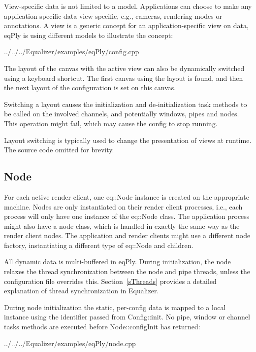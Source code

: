 \documentclass[10pt,a4]{scrartcl}
\newcommand{\sref}[1]{Section~\ref{#1}}
\begin{document}
View-specific data is not limited to a model. Applications can choose to
make any application-specific data view-specific, e.g., cameras,
rendering modes or annotations. A view is a generic concept for an
application-specific view on data, \textsf{eqPly} is using different
models to illustrate the concept:

{\footnotesize
  {../../../Equalizer/examples/eqPly/config.cpp}}

The layout of the canvas with the active view can also be dynamically
switched using a keyboard shortcut. The first canvas using the layout is
found, and then the next layout of the configuration is set on this
canvas. 

Switching a layout causes the initialization and de-initialization task
methods to be called on the involved channels, and potentially windows,
pipes and nodes. This operation might fail, which may cause the config
to stop running.

Layout switching is typically used to change the presentation of views
at runtime. The source code omitted for brevity.


\subsection{Node}

For each active render client, one \textsf{eq::Node} instance is created on the
appropriate machine. Nodes are only instantiated on their render client
processes, i.e., each process will only have one instance of the
\textsf{eq::Node} class. The application process might also have a node class,
which is handled in exactly the same way as the render client nodes. The
application and render clients might use a different node factory, instantiating
a different type of \textsf{eq::Node} and children.

All dynamic data is multi-buffered in \textsf{eqPly}. During
initialization, the node relaxes the thread synchronization between the
node and pipe threads, unless the configuration file overrides
this. \sref{sThreads} provides a detailed explanation of thread
synchronization in Equalizer.

During node initialization the static, per-config data is mapped to a
local instance using the identifier passed from
\textsf{Config::init}. No pipe, window or channel tasks methods are
executed before \textsf{Node::configInit} has returned:

{\footnotesize
  {../../../Equalizer/examples/eqPly/node.cpp}}
\end{document}
